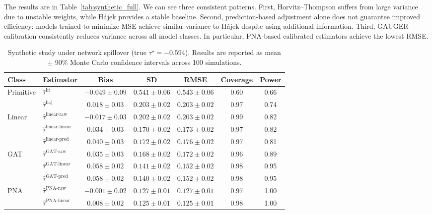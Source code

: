 \documentclass{article}
\theoremstyle{plain}
\theoremstyle{definition}
\theoremstyle{remark}
\begin{document}
The results are in Table~\ref{tab:synthetic_full}. We can see three consistent patterns. First, Horvitz--Thompson suffers from large variance due to unstable weights, while H\'{a}jek provides a stable baseline. Second, prediction-based adjustment alone does not guarantee improved efficiency: models trained to minimize MSE achieve similar variance to H\'{a}jek despite using additional information. Third, GAUGER calibration consistently reduces variance across all model classes. In particular, PNA-based calibrated estimators achieve the lowest RMSE.
\begin{table}[htbp]
\centering
\caption{Synthetic study under network spillover (true $\tau^\star = -0.594$). Results are reported as mean $\pm$ 90\% Monte Carlo confidence intervals across 100 simulations.}
\footnotesize
\begin{tabular}{ll|ccc|cc}
\toprule
Class & Estimator & Bias & SD & RMSE & Coverage & Power \\
\midrule
\multirow{2}{*}{Primitive}
& $\hat{\tau}^{\text{ht}}$ 
& $-0.049 \pm 0.09$ & $0.541 \pm 0.06$ & $0.543 \pm 0.06$ & 0.60 & 0.66 \\
& $\hat{\tau}^{\text{haj}}$ 
& $0.018 \pm 0.03$ & $0.203 \pm 0.02$ & $0.203 \pm 0.02$ & 0.97 & 0.74 \\
\midrule
\multirow{3}{*}{Linear}
& $\hat{\tau}^{\text{linear-raw}}$ 
& $-0.017 \pm 0.03$ & $0.202 \pm 0.02$ & $0.203 \pm 0.02$ & 0.99 & 0.82 \\
& $\hat{\tau}^{\text{linear-linear}}$ 
& $0.034 \pm 0.03$ & $0.170 \pm 0.02$ & $0.173 \pm 0.02$ & 0.97 & 0.82 \\
& $\hat{\tau}^{\text{linear-pred}}$ 
& $0.040 \pm 0.03$ & $0.172 \pm 0.02$ & $0.176 \pm 0.02$ & 0.97 & 0.81 \\
\midrule
\multirow{3}{*}{GAT}
& $\hat{\tau}^{\text{GAT-raw}}$ 
& $0.035 \pm 0.03$ & $0.168 \pm 0.02$ & $0.172 \pm 0.02$ & 0.96 & 0.89 \\
& $\hat{\tau}^{\text{GAT-linear}}$ 
& $0.058 \pm 0.02$ & $0.141 \pm 0.02$ & $0.152 \pm 0.02$ & 0.98 & 0.95 \\
& $\hat{\tau}^{\text{GAT-pred}}$ 
& $0.058 \pm 0.02$ & $0.140 \pm 0.02$ & $0.152 \pm 0.02$ & 0.98 & 0.95 \\
\midrule
\multirow{3}{*}{PNA}
& $\hat{\tau}^{\text{PNA-raw}}$ 
& $\mathbf{-0.001 \pm 0.02}$ & $\mathbf{0.127 \pm 0.01}$ & $\mathbf{0.127 \pm 0.01}$ & 0.97 & 1.00 \\
& $\hat{\tau}^{\text{PNA-linear}}$ 
& $\mathbf{0.008 \pm 0.02}$ & $\mathbf{0.125 \pm 0.01}$ & $\mathbf{0.125 \pm 0.01}$ & 0.98 & 1.00 \\

\end{tabular}
\end{table}
\end{document}
